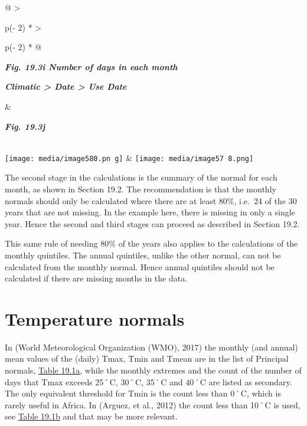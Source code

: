 \documentclass[
  letterpaper,
  DIV=11,
  numbers=noendperiod]{scrreprt}
\begin{document}
\begin{longtable}[]{@{}
  >{\raggedright\arraybackslash}p{(\columnwidth - 2\tabcolsep) * }
  >{\raggedright\arraybackslash}p{(\columnwidth - 2\tabcolsep) * }@{}}
\toprule\noalign{}
\begin{minipage}[b]{\linewidth}\raggedright
\textbf{\emph{Fig. 19.3i Number of days in each month}}

\textbf{\emph{Climatic \textgreater{} Date \textgreater{} Use Date}}
\end{minipage} & \begin{minipage}[b]{\linewidth}\raggedright
\textbf{\emph{Fig. 19.3j}}
\end{minipage} \\
\midrule\noalign{}
\endhead
\bottomrule\noalign{}
\endlastfoot
\texttt{[image: media/image580.pn g]}
&
\texttt{[image: media/image57 8.png]} \\
\end{longtable}

The second stage in the calculations is the summary of the normal for
each month, as shown in Section 19.2. The recommendation is that the
monthly normals should only be calculated where there are at least 80\%,
i.e.~24 of the 30 years that are not missing. In the example here, there
is missing in only a single year. Hence the second and third stages can
proceed as described in Section 19.2.

This same rule of needing 80\% of the years also applies to the
calculations of the monthly quintiles. The annual quintiles, unlike the
other normal, can not be calculated from the monthly normal. Hence
annual quintiles should not be calculated if there are missing months in
the data.

\section{Temperature normals}\label{temperature-normals}

In (World Meteorological Organization (WMO), 2017) the monthly (and
annual) mean values of the (daily) Tmax, Tmin and Tmean are in the list
of Principal normals, \hyperref[bookmark=id.4anzqyu]{\ul{Table 19.1a}},
while the monthly extremes and the count of the number of days that Tmax
exceeds 25˚C, 30˚C, 35˚C and 40˚C are listed as secondary. The only
equivalent threshold for Tmin is the count less than 0˚C, which is
rarely useful in Africa. In (Arguez, et al., 2012) the count less than
10˚C is used, see \hyperref[bookmark=id.2pta16n]{\ul{Table 19.1b}} and
that may be more relevant.
\end{document}
